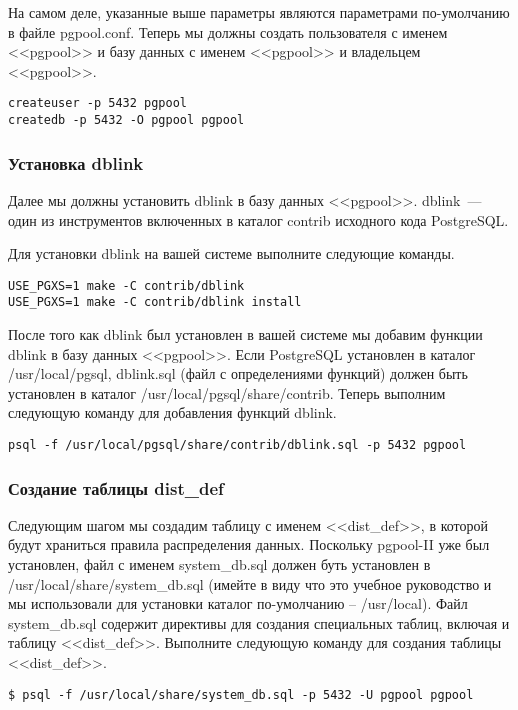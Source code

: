 На самом деле, указанные выше параметры являются параметрами по-умолчанию в файле pgpool.conf. Теперь мы должны 
создать пользователя с именем <<pgpool>> и базу данных с именем <<pgpool>> и владельцем <<pgpool>>.
\begin{lstlisting}[label=lst:pgpool27,caption=Настройка SystemDB]
createuser -p 5432 pgpool
createdb -p 5432 -O pgpool pgpool
\end{lstlisting}

\subsubsection{Установка dblink}
Далее мы должны установить dblink в базу данных <<pgpool>>. dblink~--- один из инструментов включенных в каталог 
contrib исходного кода PostgreSQL.

Для установки dblink на вашей системе выполните следующие команды.
\begin{lstlisting}[label=lst:pgpool28,caption=Установка dblink]
USE_PGXS=1 make -C contrib/dblink
USE_PGXS=1 make -C contrib/dblink install
\end{lstlisting}

После того как dblink был установлен в вашей системе мы добавим функции dblink в базу данных <<pgpool>>. Если PostgreSQL 
установлен в каталог /usr/local/pgsql, dblink.sql (файл с определениями функций) должен быть установлен в каталог 
/usr/local/pgsql/share/contrib. Теперь выполним следующую команду для добавления функций dblink.
\begin{lstlisting}[label=lst:pgpool29,caption=Установка dblink]
psql -f /usr/local/pgsql/share/contrib/dblink.sql -p 5432 pgpool
\end{lstlisting}

\subsubsection{Создание таблицы dist\_def}
Следующим шагом мы создадим таблицу с именем <<dist\_def>>, в которой будут храниться правила распределения данных. 
Поскольку pgpool-II уже был установлен, файл с именем system\_db.sql должен буть установлен в 
/usr/local/share/system\_db.sql (имейте в виду что это учебное руководство и мы использовали для установки каталог 
по-умолчанию – /usr/local). Файл system\_db.sql содержит директивы для создания специальных таблиц, включая и 
таблицу <<dist\_def>>. Выполните следующую команду для создания таблицы <<dist\_def>>.
\begin{lstlisting}[label=lst:pgpool30,caption=Создание таблицы dist\_def]
$ psql -f /usr/local/share/system_db.sql -p 5432 -U pgpool pgpool
\end{lstlisting}

